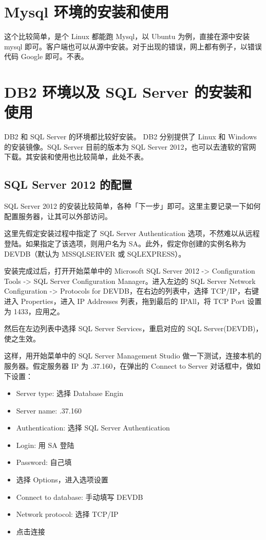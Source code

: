 \section{Mysql 环境的安装和使用}
这个比较简单，是个 Linux 都能跑 Mysql，以 Ubuntu 为例，直接在源中安装 mysql 即可。客户端也可以从源中安装。对于出现的错误，网上都有例子，以错误代码 Google 即可。不表。

\section{DB2 环境以及 SQL Server 的安装和使用}
DB2 和 SQL Server 的环境都比较好安装。 DB2 分别提供了 Linux 和 Windows 的安装镜像。SQL Server 目前的版本为 SQL Server 2012，也可以去渣软的官网下载。其安装和使用也比较简单，此处不表。

\subsection{SQL Server 2012 的配置}
SQL Server 2012 的安装比较简单，各种「下一步」即可。这里主要记录一下如何配置服务器，让其可以外部访问。

这里先假定安装过程中指定了 {\cf SQL Server Authentication} 选项，不然难以从远程登陆。如果指定了该选项，则用户名为 {\cf SA}。此外，假定你创建的实例名称为 {\cf DEVDB}（默认为 {\cf MSSQLSERVER} 或 {\cf SQLEXPRESS}）。

安装完成过后，打开开始菜单中的 {\cf Microsoft SQL Server 2012 -> Configuration Tools -> SQL Server Configuration Manager}。进入左边的 {\cf SQL Server Network Configuration -> Protocols for DEVDB}，在右边的列表中，选择 {\cf TCP/IP}，右键进入 {\cf Properties}，进入 {\cf IP Addresses} 列表，拖到最后的 {\cf IPAll}，将 {\cf TCP Port} 设置为 1433，应用之。

然后在左边列表中选择 {\cf SQL Server Services}，重启对应的 {\cf SQL Server(DEVDB)}，使之生效。

这样，用开始菜单中的 {\cf SQL Server Management Studio} 做一下测试，连接本机的服务器。假定服务器 IP 为 {.37.160}，在弹出的 {\cf Connect to Server} 对话框中，做如下设置：

\begin{itemize}
    \item {\cf Server type}: 选择 {\cf Database Engin}
    \item {\cf Server name}: {.37.160}
    \item {\cf Authentication}: 选择 {\cf SQL Server Authentication}
    \item {\cf Login}: 用 {\cf SA} 登陆
    \item {\cf Password}: 自己填
    \item 选择 {\cf Options}，进入选项设置
    \item {\cf Connect to database}: 手动填写 {\cf DEVDB}
    \item {\cf Network protocol}: 选择 {\cf TCP/IP}
    \item 点击连接
\end{itemize}

